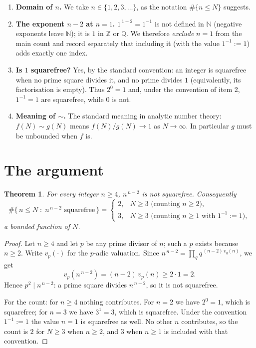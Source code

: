 \documentclass[11pt]{article}
\newtheorem{theorem}{Theorem}
\theoremstyle{definition}
\theoremstyle{remark}
\newcommand{\N}{\mathbb{N}}
\newcommand{\Z}{\mathbb{Z}}
\begin{document}
\begin{enumerate}
\item \textbf{Domain of $n$.} We take $n \in \{1,2,3,\dots\}$, as the notation
  $\#\{n \le N\}$ suggests.
\item \textbf{The exponent $n-2$ at $n=1$.} $1^{\,1-2} = 1^{-1}$ is not defined
  in $\N$ (negative exponents leave $\N$); it is $1$ in $\Z$ or $\mathbb{Q}$.
  We therefore \emph{exclude} $n=1$ from the main count and record separately
  that including it (with the value $1^{-1} := 1$) adds exactly one index.
\item \textbf{Is $1$ squarefree?} Yes, by the standard convention: an integer is
  squarefree when no prime square divides it, and no prime divides $1$
  (equivalently, its factorisation is empty). Thus $2^0 = 1$ and, under the
  convention of item 2, $1^{-1}=1$ are squarefree, while $0$ is not.
\item \textbf{Meaning of $\sim$.} The standard meaning in analytic number
  theory: $f(N) \sim g(N)$ means $f(N)/g(N) \to 1$ as $N \to \infty$. In
  particular $g$ must be unbounded when $f$ is.
\end{enumerate}

\section{The argument}

\begin{theorem}\label{thm:main}
For every integer $n \ge 4$, $n^{\,n-2}$ is not squarefree. Consequently
\[
\#\{\,n \le N \;:\; n^{\,n-2} \text{ squarefree}\,\} =
\begin{cases}
2, & N \ge 3 \text{ (counting } n \ge 2\text{)},\\
3, & N \ge 3 \text{ (counting } n \ge 1 \text{ with } 1^{-1} := 1\text{)},
\end{cases}
\]
a bounded function of $N$.
\end{theorem}

\begin{proof}
Let $n \ge 4$ and let $p$ be any prime divisor of $n$; such a $p$ exists because
$n \ge 2$. Write $v_p(\cdot)$ for the $p$-adic valuation. Since
$n^{\,n-2} = \prod_{q} q^{\,(n-2)\,v_q(n)}$, we get
\[
v_p\!\left(n^{\,n-2}\right) = (n-2)\,v_p(n) \ge 2 \cdot 1 = 2 .
\]
Hence $p^2 \mid n^{\,n-2}$: a prime square divides $n^{\,n-2}$, so it is not
squarefree.

For the count: for $n \ge 4$ nothing contributes. For $n = 2$ we have
$2^{0} = 1$, which is squarefree; for $n=3$ we have $3^{1} = 3$, which is
squarefree. Under the convention $1^{-1} := 1$ the value $n=1$ is squarefree as
well. No other $n$ contributes, so the count is $2$ for $N \ge 3$ when
$n \ge 2$, and $3$ when $n \ge 1$ is included with that convention.
\end{proof}
\end{document}
